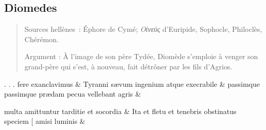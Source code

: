 \documentclass[12pt,onecolumn,twoside,a4paper]{memoir}
\begin{document}
               \subsection*{Diomedes}
               \begin{abstract}
                  Sources hellènes : Éphore de Cymé; \textit{Οἰνεύς}
                     d'Euripide, Sophocle, Philoclès, Chérémon.\par
                  Argument : À l’image de son père Tydée, Diomède s’emploie à venger son
                     grand-père qui s’est, à nouveau, fait détrôner par les fils d’Agrios.\par
               \end{abstract}
               \begin{pairs}
                  \begin{Leftside}
			\beginnumbering
			\setcounter{stanzaL}{0}
                     
                         \stanza {}.
                              .
                              .
                              fere
                              exanclavimus & 
                     Tyranni
                              sævum
                              ingenium
                              atque
                              execrabile \&
                         \stanza {}
                     passimque
                              {passimque}
                              prædam
                              pecua
                              vellebant
                              agris \&
                         \stanza {}
                     
                              multa
                              amittuntur
                              tarditie
                              et
                              socordia \&
                         \stanza {}Ita
                              et
                              fletu
                              et
                              tenebris
                              obstinatus
                              speciem
                              [
                              amisi
                              luminis & 
                     

\end{Leftside}
\end{pairs}
\end{document}
